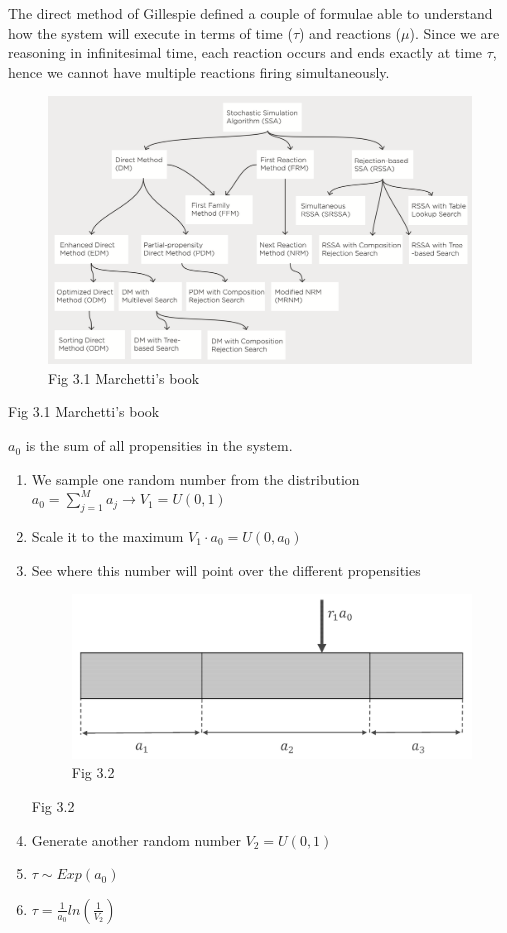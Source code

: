 The direct method of Gillespie defined a couple of formulae able to
understand how the system will execute in terms of time ($\tau$) and
reactions ($\mu$). Since we are reasoning in infinitesimal time, each
reaction occurs and ends exactly at time $\tau$, hence we cannot have
multiple reactions firing simultaneously.

\begin{figure}
\centering
\includegraphics{03_images/tree_methods.png}
\caption{Fig 3.1 Marchetti's book}
\end{figure}

Fig 3.1 Marchetti's book

$a_0$ is the sum of all propensities in the system.

\begin{enumerate}
\def\labelenumi{\arabic{enumi}.}
\item
  We sample one random number from the distribution
  $a_0 = \sum_{j=1}^{M}{a_j} \rightarrow V_1=U(0,1)$
\item
  Scale it to the maximum $V_1 \cdot a_0 =U(0,a_0)$
\item
  See where this number will point over the different propensities

  \begin{figure}
  \centering
  \includegraphics{03_images/boundaries.png}
  \caption{Fig 3.2}
  \end{figure}

  Fig 3.2
\item
  Generate another random number $V_2 =U(0,1)$
\item
  $\tau \sim Exp(a_0)$
\item
  $\tau = \frac{1}{a_0}ln(\frac{1}{V_2})$
\end{enumerate}

